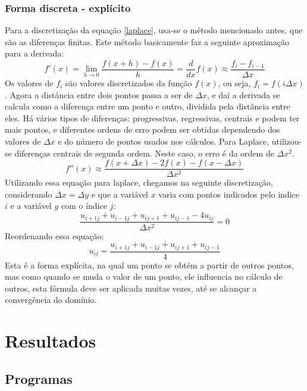 \documentclass[journal]{IEEEtran}
\begin{document}
\subsubsection{Forma discreta - explícito}
Para a discretização da equação \ref{laplace}, usa-se o método mencionado antes, que são as diferenças finitas. Este método basicamente faz a seguinte aproximação para a derivada:
\begin{equation}
f'(x)=\lim_{h\rightarrow 0}\frac{f(x+h)-f(x)}{h}=\frac{d}{dx}f(x)\approx \frac{f_i-f_{i-1}}{\Delta x}
\end{equation}
Os valores de $f_i$ são valores discretizados da função $f(x)$, ou seja, $f_i=f(i\Delta x)$. Agora a distância entre dois pontos passa a ser de $\Delta x$, e daí a derivada se calcula como a diferença entre um ponto e outro, dividida pela distância entre eles. Há vários tipos de diferenças: progressivas, regressivas, centrais e podem ter mais pontos, e diferentes ordens de erro podem ser obtidas dependendo dos valores de $\Delta x$ e do número de pontos usados nos cálculos. Para Laplace, utilizou-se diferenças centrais de segunda ordem. Neste caso, o erro é da ordem de $\Delta x^2$.
\begin{equation}
f''(x)\approx \frac{f(x+\Delta x)-2f(x)-f(x-\Delta x)}{\Delta x^2}
\end{equation}
Utilizando essa equação para laplace, chegamos na seguinte discretização, considerando $\Delta x=\Delta y$ e que a variável $x$ varia com pontos indicados pelo indice $i$ e a variável $y$ com o índice $j$:
\begin{equation}
\frac{u_{i+1j}+u_{i-1j}+u_{ij+1}+u_{ij-1}-4u_{ij}}{\Delta x^2}=0
\end{equation}
Reordenando essa equação:
\begin{equation}
  u_{ij}=\frac{u_{i+1j}+u_{i-1j}+u_{ij+1}+u_{ij-1}}{4}
\end{equation}
Esta é a forma explícita, na qual um ponto se obtém a partir de outros pontos, mas como quando se muda o valor de um ponto, ele influencia no cálculo de outros, esta fórmula deve ser aplicada muitas vezes, até se alcançar a convergência do domínio.
\section{Resultados}
\newpage
\subsection{Programas\label{exemplos}}
\newpage
\end{document}
